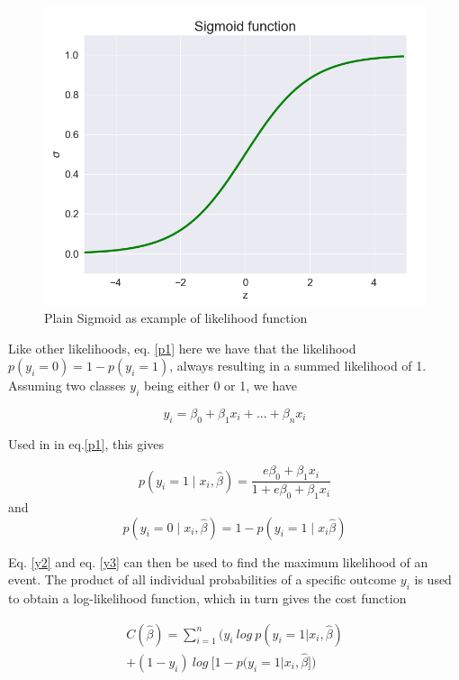 \documentclass[a4paper,11pt,twocolumn]{article}
\begin{document}
\begin{figure}[h]
\centering
\includegraphics[scale=0.75]{Sigmoid}
\caption{Plain Sigmoid as example of likelihood function}
\label{Sigmoid}
\end{figure}

Like other likelihoods,  eq. \eqref{p1} here we have that the likelihood  $p(y_i = 0) = 1-p(y_i = 1) $, always resulting in a summed likelihood of 1. Assuming two classes $y_i$  being either 0 or 1, we have

\begin{equation}
\label{y1}
y_i=\beta_0+\beta_1x_i+...+\beta_nx_i
\end{equation}

Used in in eq.\eqref{p1}, this gives 

\begin{equation}
\label{y2}
p(y_i=1\mid x_i,\hat{\beta}) = \frac{e{\beta_0+\beta_1x_i}}{1+e{\beta_0+\beta_1x_i}}
\end{equation}
and 
\begin{equation}
\label{y3}
p(y_i=0\mid x_i,\hat{\beta}) = 1 - p(y_i=1\mid x_i\hat{\beta})
\end{equation}

Eq. \eqref{y2} and eq. \eqref{y3} can then be used to find the maximum likelihood of an event. The product of all individual probabilities of a specific outcome $y_i$ is used to obtain a log-likelihood function, which in turn gives the cost function 

\begin{equation}
\begin{multlined}
C(\hat{\beta})=\sum\limits_{i=1}^{n}\big(y_i\: log\: p(y_i=1\vert x_i,\hat{\beta})\\ 
+(1-y_i)\:log\: \big[1-p(y_i=1\vert x_i,\hat{\beta}\big]\big)
\end{multlined}
\label{c1}
\end{equation}
\end{document}
